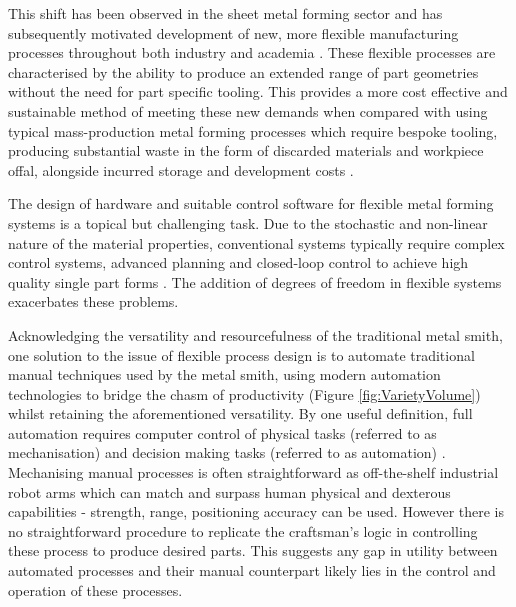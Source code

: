 This shift has been observed in the sheet metal forming sector \citep{Lee2012CaseTechnique} and has subsequently motivated development of new, more flexible manufacturing processes throughout both industry and academia \citep{Allwood2006AJapan,Yang2018FlexibilityForming}. These flexible processes are characterised by the ability to produce an extended range of part geometries without the need for part specific tooling. This provides a more cost effective and sustainable method of meeting these new demands when compared with using typical mass-production metal forming processes which require bespoke tooling, producing substantial waste in the form of discarded materials and workpiece offal, alongside incurred storage and development costs \citep{Cooper2017TheProcesses,Horton2019ImplementingComponents}. 

The design of hardware and suitable control software for flexible metal forming systems is a topical but challenging task. Due to the stochastic and non-linear nature of the material properties, conventional systems typically require complex control systems, advanced planning and closed-loop control to achieve high quality single part forms  \citep{Allwood2016Closed-loopForming, Tekkaya2015MetalProperties, Polyblank2014Closed-loopProspectus}. The addition of degrees of freedom in flexible systems exacerbates these problems. 

Acknowledging the versatility and resourcefulness of the traditional metal smith, one solution to the issue of flexible process design is to automate traditional manual techniques used by the metal smith, using modern automation technologies to bridge the chasm of productivity (Figure \ref{fig:VarietyVolume}) whilst retaining the aforementioned versatility. By one useful definition, full automation requires computer control of physical tasks (referred to as mechanisation) and decision making tasks (referred to as automation) \citep{Frohm2008LevelsManufacturing}. Mechanising manual processes is often straightforward as off-the-shelf industrial robot arms which can match and surpass human physical and dexterous capabilities - strength, range, positioning accuracy can be used. However there is no straightforward procedure to replicate the craftsman's logic in controlling these process to produce desired parts. This suggests any gap in utility between automated processes and their manual counterpart likely lies in the control and operation of these processes.

